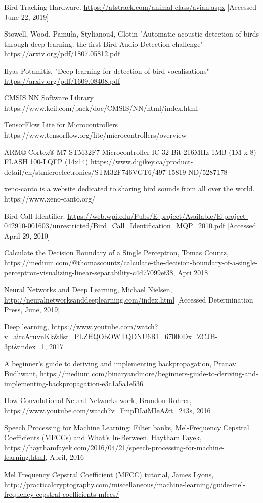 \documentclass{article}
\begin{document}
\begin{thebibliography}{1}

Bird Tracking Hardware.
\url{https://atstrack.com/animal-class/avian.aspx} [Accessed June 22, 2019]

Stowell, Wood, Pamuła, Stylianou4, Glotin "Automatic acoustic detection of birds through deep learning: the first Bird Audio Detection challenge"
\url{https://arxiv.org/pdf/1807.05812.pdf}

Ilyas Potamitis, "Deep learning for detection of bird vocalisations"
\url{https://arxiv.org/pdf/1609.08408.pdf}

CMSIS NN Software Library
https://www.keil.com/pack/doc/CMSIS/NN/html/index.html

TensorFlow Lite for Microcontrollers
https://www.tensorflow.org/lite/microcontrollers/overview

ARM® Cortex®-M7 STM32F7 Microcontroller IC 32-Bit 216MHz 1MB (1M x 8) FLASH 100-LQFP (14x14)
https://www.digikey.ca/product-detail/en/stmicroelectronics/STM32F746VGT6/497-15819-ND/5287178

xeno-canto is a website dedicated to sharing bird sounds from all over the world.
https://www.xeno-canto.org/

Bird Call Identifier.
\url{https://web.wpi.edu/Pubs/E-project/Available/E-project-042910-001603/unrestricted/Bird_Call_Identification_MQP_2010.pdf} [Accessed April 29, 2010]

Calculate the Decision Boundary of a Single Perceptron,
Tomas Countz,
\url{https://medium.com/@thomascountz/calculate-the-decision-boundary-of-a-single-perceptron-visualizing-linear-separability-c4d77099ef38}, Apri 2018

Neural Networks and Deep Learning,
Michael Nielsen,
\url{http://neuralnetworksanddeeplearning.com/index.html} [Accessed Determination Press, June, 2019]

Deep learning,
\url{https://www.youtube.com/watch?v=aircAruvnKk&list=PLZHQObOWTQDNU6R1_67000Dx_ZCJB-3pi&index=1},
2017

A beginner’s guide to deriving and implementing backpropagation,
Pranav Budhwant,
\url{https://medium.com/binaryandmore/beginners-guide-to-deriving-and-implementing-backpropagation-e3c1a5a1e536}

How Convolutional Neural Networks work,
Brandon Rohrer,
\url{https://www.youtube.com/watch?v=FmpDIaiMIeA&t=243s},
2016

Speech Processing for Machine Learning: Filter banks, Mel-Frequency Cepstral Coefficients (MFCCs) and What's In-Between,
Haytham Fayek,
\url{https://haythamfayek.com/2016/04/21/speech-processing-for-machine-learning.html},
April, 2016

Mel Frequency Cepstral Coefficient (MFCC) tutorial,
James Lyons,
\url{http://practicalcryptography.com/miscellaneous/machine-learning/guide-mel-frequency-cepstral-coefficients-mfccs/}

\end{thebibliography}
\newpage
\end{document}
